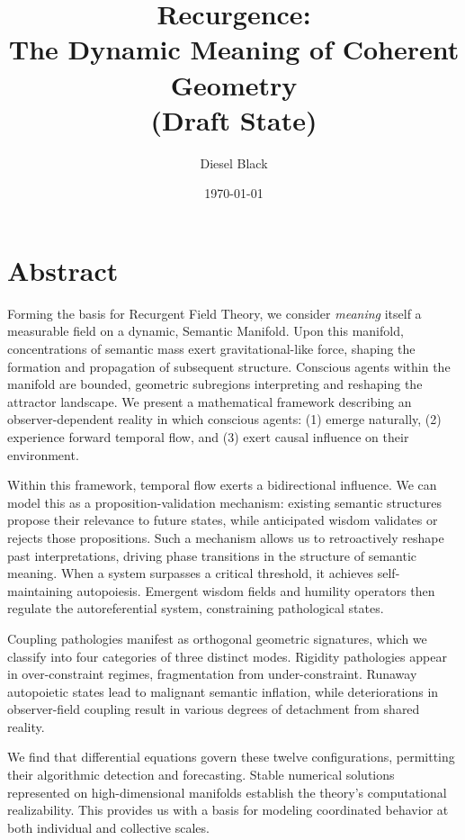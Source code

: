 \documentclass[11pt, a4paper]{report}
\title{{\Huge Recurgence}: \\ The Dynamic Meaning of Coherent Geometry \\ \vspace{1em} \small{(Draft State)}}
\author{Diesel Black}
\date{\today}
\begin{document}

\maketitle

\section*{Abstract}

Forming the basis for Recurgent Field Theory, we consider \textit{meaning} itself a measurable field on a dynamic, Semantic Manifold. Upon this manifold, concentrations of semantic mass exert gravitational-like force, shaping the formation and propagation of subsequent structure. Conscious agents within the manifold are bounded, geometric subregions interpreting and reshaping the attractor landscape. We present a mathematical framework describing an observer-dependent reality in which conscious agents: (1) emerge naturally, (2) experience forward temporal flow, and (3) exert causal influence on their environment.

\vspace{1em}

Within this framework, temporal flow exerts a bidirectional influence. We can model this as a proposition-validation mechanism: existing semantic structures propose their relevance to future states, while anticipated wisdom validates or rejects those propositions. Such a mechanism allows us to retroactively reshape past interpretations, driving phase transitions in the structure of semantic meaning. When a system surpasses a critical threshold, it achieves self-maintaining autopoiesis. Emergent wisdom fields and humility operators then regulate the autoreferential system, constraining pathological states.

\vspace{1em}

Coupling pathologies manifest as orthogonal geometric signatures, which we classify into four categories of three distinct modes. Rigidity pathologies appear in over-constraint regimes, fragmentation from under-constraint. Runaway autopoietic states lead to malignant semantic inflation, while deteriorations in observer-field coupling result in various degrees of detachment from shared reality.

\vspace{1em}

We find that differential equations govern these twelve configurations, permitting their algorithmic detection and forecasting. Stable numerical solutions represented on high-dimensional manifolds establish the theory's computational realizability. This provides us with a basis for modeling coordinated behavior at both individual and collective scales.
\end{document}
